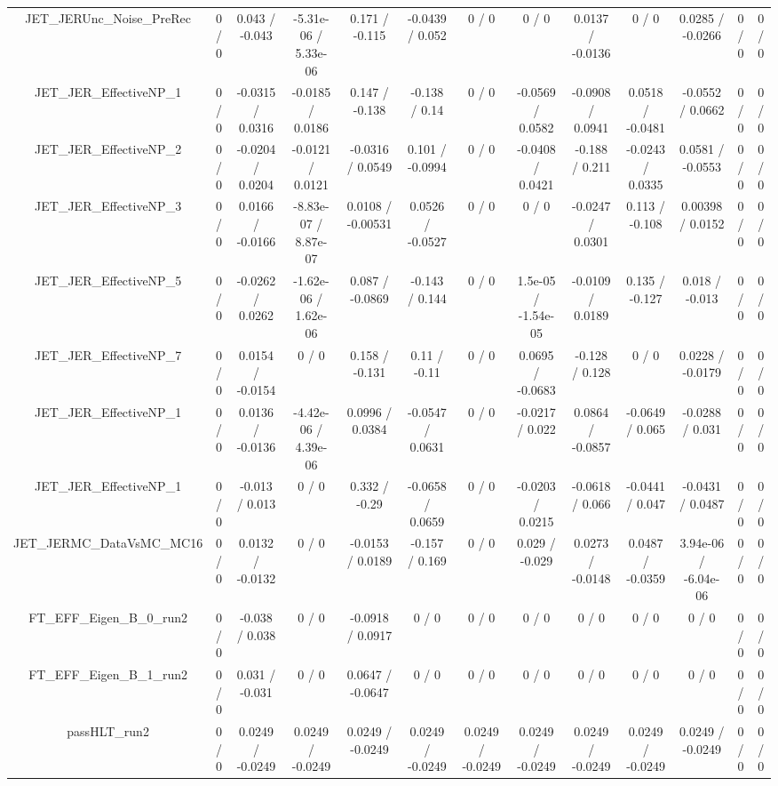 \documentclass[10pt]{article}
\begin{document}
\begin{table}[htbp]
\begin{center}
\begin{tabular}{|c|c|c|c|c|c|c|c|c|c|c|c|c|}
  JET_JERUnc_Noise_PreRec & 0 / 0 & 0.043 / -0.043 & -5.31e-06 / 5.33e-06 & 0.171 / -0.115 & -0.0439 / 0.052 & 0 / 0 & 0 / 0 & 0.0137 / -0.0136 & 0 / 0 & 0.0285 / -0.0266 & 0 / 0 & 0 / 0 \\ 
  JET_JER_EffectiveNP_1 & 0 / 0 & -0.0315 / 0.0316 & -0.0185 / 0.0186 & 0.147 / -0.138 & -0.138 / 0.14 & 0 / 0 & -0.0569 / 0.0582 & -0.0908 / 0.0941 & 0.0518 / -0.0481 & -0.0552 / 0.0662 & 0 / 0 & 0 / 0 \\ 
  JET_JER_EffectiveNP_2 & 0 / 0 & -0.0204 / 0.0204 & -0.0121 / 0.0121 & -0.0316 / 0.0549 & 0.101 / -0.0994 & 0 / 0 & -0.0408 / 0.0421 & -0.188 / 0.211 & -0.0243 / 0.0335 & 0.0581 / -0.0553 & 0 / 0 & 0 / 0 \\ 
  JET_JER_EffectiveNP_3 & 0 / 0 & 0.0166 / -0.0166 & -8.83e-07 / 8.87e-07 & 0.0108 / -0.00531 & 0.0526 / -0.0527 & 0 / 0 & 0 / 0 & -0.0247 / 0.0301 & 0.113 / -0.108 & 0.00398 / 0.0152 & 0 / 0 & 0 / 0 \\ 
  JET_JER_EffectiveNP_5 & 0 / 0 & -0.0262 / 0.0262 & -1.62e-06 / 1.62e-06 & 0.087 / -0.0869 & -0.143 / 0.144 & 0 / 0 & 1.5e-05 / -1.54e-05 & -0.0109 / 0.0189 & 0.135 / -0.127 & 0.018 / -0.013 & 0 / 0 & 0 / 0 \\ 
  JET_JER_EffectiveNP_7 & 0 / 0 & 0.0154 / -0.0154 & 0 / 0 & 0.158 / -0.131 & 0.11 / -0.11 & 0 / 0 & 0.0695 / -0.0683 & -0.128 / 0.128 & 0 / 0 & 0.0228 / -0.0179 & 0 / 0 & 0 / 0 \\ 
  JET_JER_EffectiveNP_1 & 0 / 0 & 0.0136 / -0.0136 & -4.42e-06 / 4.39e-06 & 0.0996 / 0.0384 & -0.0547 / 0.0631 & 0 / 0 & -0.0217 / 0.022 & 0.0864 / -0.0857 & -0.0649 / 0.065 & -0.0288 / 0.031 & 0 / 0 & 0 / 0 \\ 
  JET_JER_EffectiveNP_1 & 0 / 0 & -0.013 / 0.013 & 0 / 0 & 0.332 / -0.29 & -0.0658 / 0.0659 & 0 / 0 & -0.0203 / 0.0215 & -0.0618 / 0.066 & -0.0441 / 0.047 & -0.0431 / 0.0487 & 0 / 0 & 0 / 0 \\ 
  JET_JERMC_DataVsMC_MC16 & 0 / 0 & 0.0132 / -0.0132 & 0 / 0 & -0.0153 / 0.0189 & -0.157 / 0.169 & 0 / 0 & 0.029 / -0.029 & 0.0273 / -0.0148 & 0.0487 / -0.0359 & 3.94e-06 / -6.04e-06 & 0 / 0 & 0 / 0 \\ 
  FT_EFF_Eigen_B_0_run2 & 0 / 0 & -0.038 / 0.038 & 0 / 0 & -0.0918 / 0.0917 & 0 / 0 & 0 / 0 & 0 / 0 & 0 / 0 & 0 / 0 & 0 / 0 & 0 / 0 & 0 / 0 \\ 
  FT_EFF_Eigen_B_1_run2 & 0 / 0 & 0.031 / -0.031 & 0 / 0 & 0.0647 / -0.0647 & 0 / 0 & 0 / 0 & 0 / 0 & 0 / 0 & 0 / 0 & 0 / 0 & 0 / 0 & 0 / 0 \\ 
  passHLT_run2 & 0 / 0 & 0.0249 / -0.0249 & 0.0249 / -0.0249 & 0.0249 / -0.0249 & 0.0249 / -0.0249 & 0.0249 / -0.0249 & 0.0249 / -0.0249 & 0.0249 / -0.0249 & 0.0249 / -0.0249 & 0.0249 / -0.0249 & 0 / 0 & 0 / 0 \\ 

\end{tabular}
\end{center}
\end{table}
\end{document}
